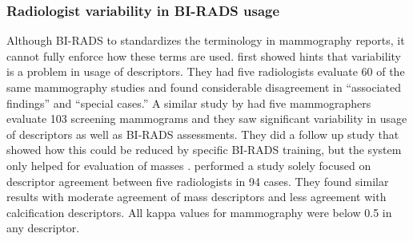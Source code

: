 \subsubsection{Radiologist variability in BI-RADS usage}
Although BI-RADS to standardizes the terminology in mammography reports, it cannot fully enforce how these terms are used.  first showed hints that variability is a problem in usage of descriptors. They had five radiologists evaluate 60 of the same mammography studies and found considerable disagreement in ``associated findings'' and ``special cases.'' A similar study by  had five mammographers evaluate 103 screening mammograms and they saw significant variability in usage of descriptors as well as BI-RADS assessments. They did a follow up study that showed how this could be reduced by specific BI-RADS training, but the system only helped for evaluation of masses \cite{Berg:2002fy}.  performed a study solely focused on descriptor agreement between five radiologists in 94 cases. They found similar results with moderate agreement of mass descriptors and less agreement with calcification descriptors. All kappa values for mammography were below 0.5 in any descriptor.



